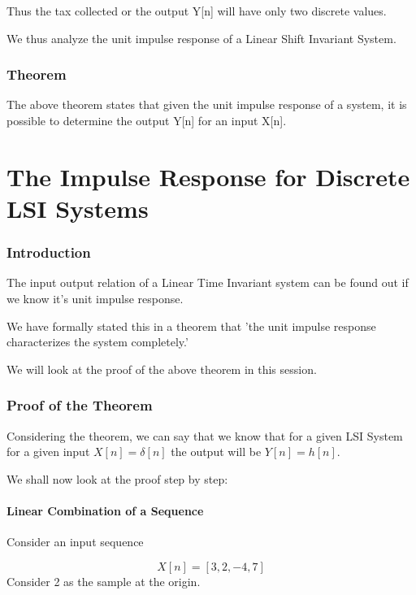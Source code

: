 Thus the tax collected or the output Y[n] will have only two discrete values. 

We thus analyze the unit impulse response of a Linear Shift Invariant System. 



\subsection{Theorem}

The above theorem states that given the unit impulse response of a system, it is possible to determine the output Y[n] for an input X[n].
 

\pagebreak

\chapter{The Impulse Response for Discrete LSI Systems}

\setcounter{section}{0}

\subsection{Introduction}
The input output relation of a Linear Time Invariant system can be found out if we know it's unit impulse response. 

We have formally stated this in a theorem that 'the unit impulse response characterizes the system completely.' 

We will look at the proof of the above theorem in this session.

\subsection{Proof of the Theorem}
Considering the theorem, we can say that we know that for a given LSI System for a given input $ X[n]=\delta[n]$ the output will be $Y[n]=h[n]$.

We shall now look at the proof step by step:


\subsubsection{Linear Combination of a Sequence}
Consider an input sequence

$$X[n]= [3, 2, -4, 7]$$
Consider 2 as the sample at the origin.


